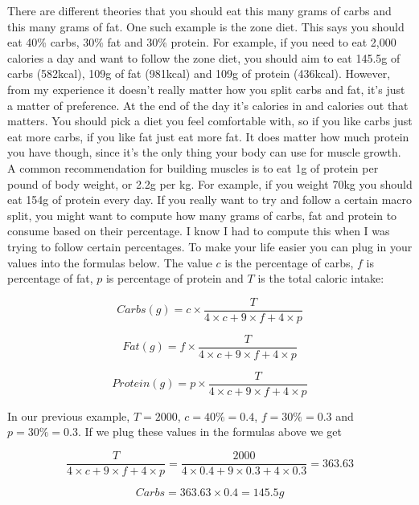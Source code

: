 \documentclass[openany, 12pt]{book}
\begin{document}
	There are different theories that you should eat this many grams of carbs and this many grams of fat. One such example is the zone diet.
        This says you should eat 40\% carbs, 30\% fat and 30\% protein. For example,
	if you need to eat 2,000 calories a day and want to follow the zone diet, you should aim to eat 145.5g of carbs (582kcal), 109g of fat (981kcal) and 109g of protein (436kcal).
	However, from my experience it doesn't really matter how you split carbs and fat, it's just a matter of preference. At the end of the day it's calories in and calories out that matters.
        You should pick a diet you feel comfortable with, so if you like carbs
        just eat more carbs, if you like fat just eat more fat. It does matter how much protein you have though, since it's the only thing your body can use for muscle growth. A common
        recommendation for building muscles is to eat 1g of protein per pound of body weight, or 2.2g per kg. For example, if you weight 70kg you should eat 154g of protein every day.
	If you really want to try and follow a certain macro split, you might want to compute how many grams of carbs, fat and protein to consume based on their percentage. I know
	I had to compute this when I was trying to follow certain percentages. To make your life easier you can plug in your values into the formulas below. The value $c$ is the 
	percentage of carbs, $f$ is percentage of fat, $p$ is percentage of protein and $T$ is the total caloric intake:
	
	\begin{equation}
		Carbs(g) = c \times \frac{T}{4 \times c + 9 \times f + 4 \times p}
	\end{equation}
	
	\begin{equation}
		Fat(g) = f \times \frac{T}{4 \times c + 9 \times f + 4 \times p}
	\end{equation}
		
	\begin{equation}
		Protein(g) = p \times \frac{T}{4 \times c + 9 \times f + 4 \times p}
	\end{equation}
	
	In our previous example, $T = 2000$, $c = 40\% = 0.4$, $f = 30\% = 0.3$ and $p = 30\% = 0.3$. If we plug these values in the formulas above we get
	
	$$ \frac{T}{4 \times c + 9 \times f + 4 \times p} = \frac{2000}{4 \times 0.4 + 9 \times 0.3 + 4 \times 0.3} = 363.63 $$
	
	$$ Carbs = 363.63 \times 0.4 = 145.5g $$
	
\end{document}
